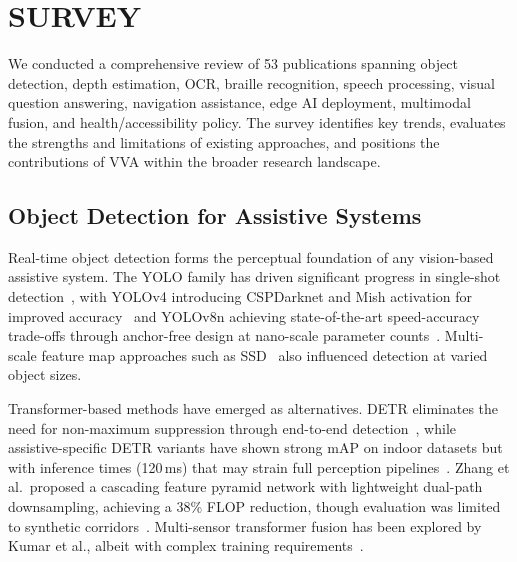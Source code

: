 \section{SURVEY}
We conducted a comprehensive review of 53 publications spanning object detection, depth estimation, OCR, braille recognition, speech processing, visual question answering, navigation assistance, edge AI deployment, multimodal fusion, and health/accessibility policy. The survey identifies key trends, evaluates the strengths and limitations of existing approaches, and positions the contributions of VVA within the broader research landscape.
\subsection{Object Detection for Assistive Systems}

Real-time object detection forms the perceptual foundation of any vision-based assistive system. The YOLO family has driven significant progress in single-shot detection~\cite{redmon2016yolo}, with YOLOv4 introducing CSPDarknet and Mish activation for improved accuracy~\cite{bochkovskiy2020yolov4} and YOLOv8n achieving state-of-the-art speed-accuracy trade-offs through anchor-free design at nano-scale parameter counts~\cite{jocher2023yolov8}. Multi-scale feature map approaches such as SSD~\cite{liu2016ssd} also influenced detection at varied object sizes.

Transformer-based methods have emerged as alternatives. DETR eliminates the need for non-maximum suppression through end-to-end detection~\cite{carion2020detr}, while assistive-specific DETR variants have shown strong mAP on indoor datasets but with inference times (120\,ms) that may strain full perception pipelines~\cite{enhancing_detr_assistive2024}. Zhang et al.\ proposed a cascading feature pyramid network with lightweight dual-path downsampling, achieving a 38\% FLOP reduction, though evaluation was limited to synthetic corridors~\cite{blind_aided_cascading2024}. Multi-sensor transformer fusion has been explored by Kumar et al., albeit with complex training requirements~\cite{transformer_multimodal_detection2024}.




